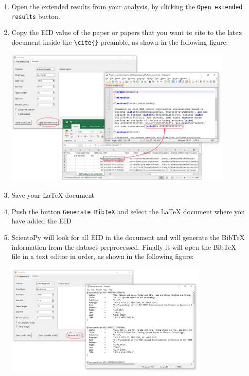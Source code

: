 \documentclass[10pt,letterpaper]{article}
\begin{document}
\begin{enumerate}
\item Open the extended results from your analysis, by clicking the \verb|Open extended results| button.
\item Copy the EID value of the paper or papers that you want to cite to the latex document inside the \verb|\cite{}| preamble, as shown in the following figure:

\begin{center}
	\includegraphics[width=0.9\textwidth]{./figures/win_generate_bib1.eps}
\end{center}

\item Save your LaTeX document 

\item Push the button \verb|Generate BibTeX| and select the LaTeX document where you have added the EID

\item ScientoPy will look for all EID in the document and will generate the BibTeX information from the dataset preprocessed. Finally it will open the BibTeX file in a text editor in order, as shown in the following figure:

\begin{center}
	\includegraphics[width=0.8\textwidth]{./figures/win_generate_bib2.eps}
\end{center}

\end{enumerate}
\end{document}
